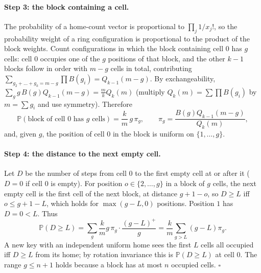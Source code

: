 \documentclass[11pt,a4paper]{article}
\theoremstyle{definition}
\theoremstyle{remark}
\newcommand{\Prob}{\mathbb{P}}
\begin{document}
\paragraph{Step 3: the block containing a cell.} The probability of a home-count vector is proportional to $\prod_j1/x_j!$, so the probability weight of a ring configuration is proportional to the product of the block weights. Count configurations in which the block containing cell $0$ has $g$ cells: cell $0$ occupies one of the $g$ positions of that block, and the other $k-1$ blocks follow in order with $m-g$ cells in total, contributing $\sum_{g_2+\dots+g_k=m-g}\prod B(g_i)=Q_{k-1}(m-g)$. By exchangeability, $\sum_g g\,B(g)Q_{k-1}(m-g)=\frac mk Q_k(m)$ (multiply $Q_k(m)=\sum\prod B(g_i)$ by $m=\sum g_i$ and use symmetry). Therefore
\[
\Prob(\text{block of cell }0\text{ has }g\text{ cells})=\frac{k}{m}\,g\,\pi_g,\qquad \pi_g=\frac{B(g)Q_{k-1}(m-g)}{Q_k(m)},
\]
and, given $g$, the position of cell $0$ in the block is uniform on $\{1,\dots,g\}$.

\paragraph{Step 4: the distance to the next empty cell.} Let $D$ be the number of steps from cell $0$ to the first empty cell at or after it ($D=0$ if cell $0$ is empty). For position $o\in\{2,\dots,g\}$ in a block of $g$ cells, the next empty cell is the first cell of the next block, at distance $g+1-o$, so $D\ge L$ iff $o\le g+1-L$, which holds for $\max(g-L,0)$ positions. Position $1$ has $D=0<L$. Thus
\[
\Prob(D\ge L)=\sum_g\frac kmg\,\pi_g\cdot\frac{(g-L)^+}{g}=\frac km\sum_{g>L}(g-L)\pi_g .
\]
A new key with an independent uniform home sees the first $L$ cells all occupied iff $D\ge L$ from its home; by rotation invariance this is $\Prob(D\ge L)$ at cell $0$. The range $g\le n+1$ holds because a block has at most $n$ occupied cells. $\square$
\end{document}
